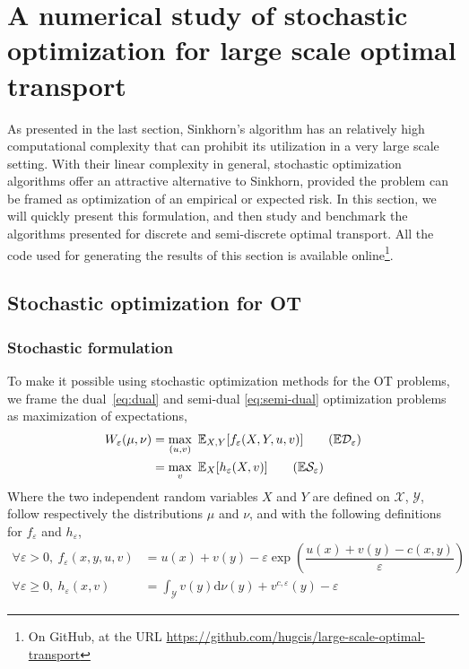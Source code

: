 \section{A numerical study of stochastic optimization for large scale optimal transport}
As presented in the last section, Sinkhorn's algorithm has an relatively high computational complexity that can prohibit its utilization in a very large scale setting. With their linear complexity in general, stochastic optimization algorithms offer an attractive alternative to Sinkhorn, provided the problem can be framed as optimization of an empirical or expected risk. In this section, we will quickly present this formulation, and then study and benchmark the algorithms presented for discrete and semi-discrete optimal transport. All the code used for generating the results of this section is available online\footnote{On GitHub, at the URL \url{https://github.com/hugcis/large-scale-optimal-transport}}.

\subsection{Stochastic optimization for OT}

\subsubsection{Stochastic formulation} \label{section:stoch_formulation}
To make it possible using stochastic optimization methods for the OT problems, we frame the dual \eqref{eq:dual} and semi-dual \eqref{eq:semi-dual} optimization problems as maximization of expectations,
\begin{align*}
    W_\varepsilon(\mu, \nu) &= \max_{(u, v)}\ \mathbb{E}_{X, Y}[f_\varepsilon(X, Y, u, v)] \tag{$\mathbb{E}\mathcal{D_\varepsilon}$}\\
    & = \max_{v}\  \mathbb{E}_{X}[h_\varepsilon(X, v)] \tag{$\mathbb{E}\mathcal{S_\varepsilon}$} \label{eq:stoch-semi-dual}
\end{align*}
Where the two independent random variables $X$ and $Y$ are defined on $\mathcal{X}$, $\mathcal{Y}$, follow respectively the distributions $\mu$ and $\nu$, and with the following definitions for $f_\varepsilon$ and $h_\varepsilon$,
\begin{align*}
    \forall \varepsilon > 0,\ f_\varepsilon(x, y, u, v) &= u(x) + v(y) - \varepsilon\exp\left( \dfrac{u(x) + v(y) - c(x, y)}{\varepsilon} \right)\\
    \forall \varepsilon \geq 0,\ h_\varepsilon(x, v) &= \int_\mathcal{Y} v(y)\text{d}\nu(y)  + v^{c, \varepsilon}(y) - \varepsilon
\end{align*}

